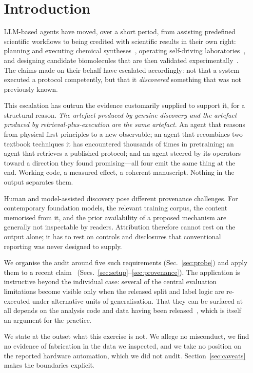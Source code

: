 \documentclass[11pt,a4paper]{article}
\begin{document}
\section{Introduction}
\label{sec:intro}

LLM-based agents have moved, over a short period, from assisting predefined
scientific workflows to being credited with scientific results in their own
right: planning and executing chemical syntheses~\cite{boiko}, operating
self-driving laboratories~\cite{burger}, and designing candidate biomolecules
that are then validated experimentally~\cite{swanson}. The claims made on
their behalf have escalated accordingly: not that a system executed a protocol
competently, but that it \emph{discovered} something that was not previously
known.

This escalation has outrun the evidence customarily supplied to support it,
for a structural reason. \emph{The artefact produced by genuine discovery and
the artefact produced by retrieval-plus-execution are the same artefact.} An
agent that reasons from physical first principles to a new observable; an
agent that recombines two textbook techniques it has encountered thousands of
times in pretraining; an agent that retrieves a published protocol; and an
agent steered by its operators toward a direction they found promising---all
four emit the same thing at the end. Working code, a measured effect, a
coherent manuscript. Nothing in the output separates them.

Human and model-assisted discovery pose different provenance challenges. For
contemporary foundation models, the relevant training corpus, the content
memorised from it, and the prior availability of a proposed mechanism are
generally not inspectable by readers. Attribution therefore cannot rest on the
output alone; it has to rest on controls and disclosures that conventional
reporting was never designed to supply.

We organise the audit around five such requirements (Sec.~\ref{sec:probe}) and
apply them to a recent claim~\cite{qiushi}
(Secs.~\ref{sec:setup}--\ref{sec:provenance}).
The application is instructive beyond the individual case: several of the
central evaluation limitations become visible only when the released split and
label logic are re-executed under alternative units of generalisation. That
they can be surfaced at all depends on the analysis code and data having been
released~\cite{zenodo}, which is itself an argument for the practice.

We state at the outset what this exercise is not. We allege no misconduct, we
find no evidence of fabrication in the data we inspected, and we take no
position on the reported hardware automation, which we did not audit.
Section~\ref{sec:caveats} makes the boundaries explicit.
\end{document}
